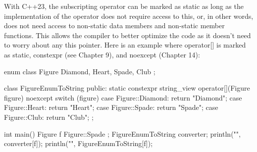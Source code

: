 

With C++23, the subscripting operator can be marked as static as long as the implementation of the operator does not require access to this, or, in other words, does not need access to non-static data members and non-static member functions. This allows the compiler to better optimize the code as it doesn’t need to worry about any this pointer. Here is an example where operator[] is marked as static, constexpr (see Chapter 9), and noexcept (Chapter 14):

\begin{cpp}
enum class Figure { Diamond, Heart, Spade, Club };

class FigureEnumToString
{
    public:
        static constexpr string_view operator[](Figure figure) noexcept
        {
            switch (figure) {
                case Figure::Diamond: return "Diamond";
                case Figure::Heart: return "Heart";
                case Figure::Spade: return "Spade";
                case Figure::Club: return "Club";
            }
        }
};

int main()
{
    Figure f { Figure::Spade };
    FigureEnumToString converter;
    println("{}", converter[f]);
    println("{}", FigureEnumToString{}[f]);
}
\end{cpp}












